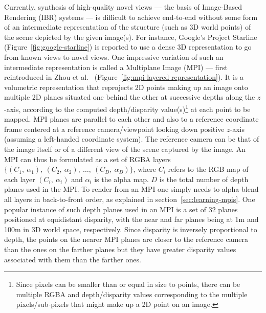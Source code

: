 Currently, synthesis of high-quality novel views --- the basis of Image-Based Rendering (IBR) systems --- is difficult to achieve end-to-end without some form of an intermediate representation of the structure (such as 3D world points) of the scene depicted by the given image(s). For instance, Google's Project Starline (Figure~\ref{fig:google-starline}) is reported to use a dense 3D representation to go from known views to novel views. One impressive variation of such an intermediate representation is called a Multiplane Image (MPI) --- first reintroduced in Zhou et al.~\cite{zhou2018stereo} (Figure~\ref{fig:mpi-layered-representation}). It is a volumetric representation that reprojects 2D points making up an image onto multiple 2D planes situated one behind the other at successive depths along the $z$-axis, according to the computed depth/disparity value(s)\footnote{Since pixels can be smaller than or equal in size to points, there can be multiple RGBA and depth/disparity values corresponding to the multiple pixels/sub-pixels that might make up a 2D point on an image.} at each point to be mapped. MPI planes are parallel to each other and also to a reference coordinate frame centered at a reference camera/viewpoint looking down positive $z$-axis (assuming a left-handed coordinate system). The reference camera can be that of the image itself or of a different view of the scene captured by the image. An MPI can thus be formulated as a set of RGBA layers $\{(C_1,\ \alpha_1),\ (C_2,\ \alpha_2),\ \ldots,\ (C_D,\ \alpha_D)\}$, where $C_i$ refers to the RGB map of each layer $(C_i,\ \alpha_i)$ and $\alpha_i$ is the alpha map. $D$ is the total number of depth planes used in the MPI. To render from an MPI one simply needs to alpha-blend all layers in back-to-front order, as explained in section~\ref{sec:learning-mpis}. One popular instance of such depth planes used in an MPI is a set of 32 planes positioned at equidistant disparity, with the near and far planes being at 1m and 100m in 3D world space, respectively. Since disparity is inversely proportional to depth, the points on the nearer MPI planes are closer to the reference camera than the ones on the farther planes but they have greater disparity values associated with them than the farther ones.

